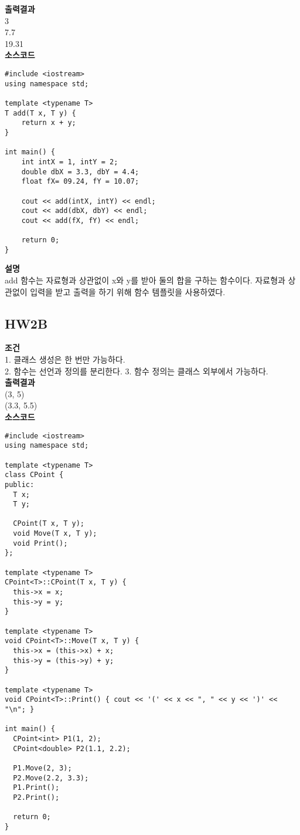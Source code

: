 \documentclass{article}
\begin{document}
\noindent \textbf{출력결과} \\ 3 \\ 7.7 \\ 19.31 \\

\noindent \textbf{소스코드}
\begin{verbatim}
#include <iostream>
using namespace std;

template <typename T>
T add(T x, T y) {
    return x + y;
}

int main() {
    int intX = 1, intY = 2;
    double dbX = 3.3, dbY = 4.4;
    float fX= 09.24, fY = 10.07;
    
    cout << add(intX, intY) << endl;
    cout << add(dbX, dbY) << endl;
    cout << add(fX, fY) << endl;
    
    return 0;
}
\end{verbatim}

\noindent \textbf{설명} \\
add 함수는 자료형과 상관없이 x와 y를 받아 둘의 합을 구하는 함수이다. 자료형과 상관없이 입력을 받고 출력을 하기 위해 함수 템플릿을 사용하였다.

\subsection{HW2B}
\noindent \textbf{조건} \\ 1. 클래스 생성은 한 번만 가능하다. \\ 2. 함수는 선언과 정의를 분리한다. 3. 함수 정의는 클래스 외부에서 가능하다. \\

\noindent \textbf{출력결과} \\ (3, 5) \\ (3.3, 5.5) \\ 

\noindent \textbf{소스코드}
\begin{verbatim}
#include <iostream>
using namespace std;

template <typename T>
class CPoint {
public:
  T x;
  T y;

  CPoint(T x, T y);
  void Move(T x, T y);
  void Print();
};

template <typename T>
CPoint<T>::CPoint(T x, T y) {
  this->x = x;
  this->y = y;
}

template <typename T>
void CPoint<T>::Move(T x, T y) {
  this->x = (this->x) + x;
  this->y = (this->y) + y;
}

template <typename T>
void CPoint<T>::Print() { cout << '(' << x << ", " << y << ')' << "\n"; }

int main() {
  CPoint<int> P1(1, 2);
  CPoint<double> P2(1.1, 2.2);

  P1.Move(2, 3);
  P2.Move(2.2, 3.3);
  P1.Print();
  P2.Print();

  return 0;
}
\end{verbatim}
\end{document}
